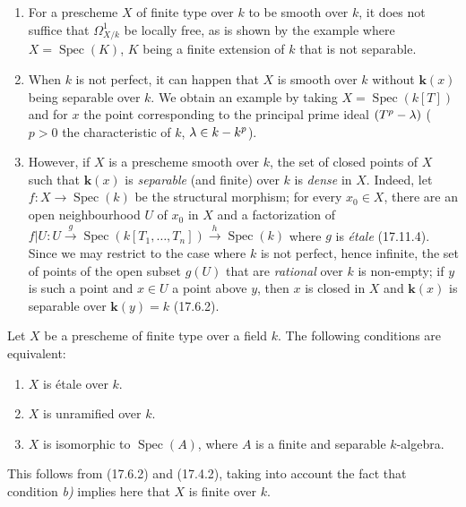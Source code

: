 \begin{remarks}[17.15.10]
\label{IV.17.15.10}
\begin{enumerate}
  \item[(i)] For a prescheme $X$ of finite type over $k$ to be smooth over $k$, it does not suffice that $\varOmega^1_{X/k}$ be locally free, as is shown by the example where $X=\operatorname{Spec}(K)$, $K$ being a finite extension of $k$ that is not separable.
  \item[(ii)] When $k$ is not perfect, it can happen that $X$ is smooth over $k$ without $\boldsymbol{k}(x)$ being separable over $k$. We obtain an example by taking $X=\operatorname{Spec}(k[T])$ and for $x$ the point corresponding to the principal prime ideal $(T^p-\lambda)$ ($p>0$ the characteristic of $k$, $\lambda\in k- k^p$).
  \item[(iii)] However, if $X$ is a prescheme smooth over $k$, the set of closed points of $X$ such that $\boldsymbol{k}(x)$ is \emph{separable} (and finite) over $k$ is \emph{dense} in $X$. Indeed, let $f:X\to\operatorname{Spec}(k)$ be the structural morphism; for every $x_0\in X$, there are an open neighbourhood $U$ of $x_0$ in $X$ and a factorization of $f|U:U\xrightarrow{g}\operatorname{Spec}(k[T_1,\ldots,T_n])\xrightarrow{h}\operatorname{Spec}(k)$ where $g$ is \emph{étale} (17.11.4). Since we may restrict to the case where $k$ is not perfect, hence infinite, the set of points of the open subset $g(U)$ that are \emph{rational} over $k$ is non-empty; if $y$ is such a point and $x\in U$ a point above $y$, then $x$ is closed in $X$ and $\boldsymbol{k}(x)$ is separable over $\boldsymbol{k}(y)=k$ (17.6.2).
\end{enumerate}
\end{remarks}

\begin{proposition}[17.15.11]
\label{IV.17.15.11}
Let $X$ be a prescheme of finite type over a field $k$. The following conditions are equivalent:
\begin{enumerate}
  \item[\textup{a)}] $X$ is étale over $k$.
  \item[\textup{b)}] $X$ is unramified over $k$.
  \item[\textup{c)}] $X$ is isomorphic to $\operatorname{Spec}(A)$, where $A$ is a finite and separable $k$-algebra.
\end{enumerate}
\end{proposition}

This follows from (17.6.2) and (17.4.2), taking into account the fact that condition \emph{b)} implies here that $X$ is finite over $k$.

